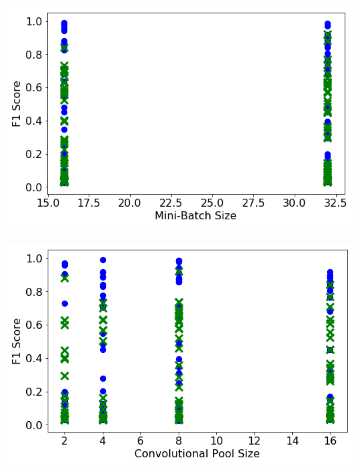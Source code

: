 \begin{figure}[H]
     \begin{subfigure}[b]{0.49\textwidth}
         \centering
         \includegraphics[width=\textwidth]{images/cnn_batch_size.png}
         \caption{}
         \label{fig:cnn_batch_size}
     \end{subfigure}
     \hfill
     \begin{subfigure}[b]{0.49\textwidth}
         \centering
         \includegraphics[width=\textwidth]{images/cnn_pooling_size.png}
         \caption{}
         \label{fig:cnn_pooling_size}
     \end{subfigure}


\end{figure}
